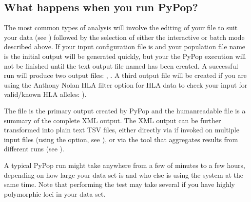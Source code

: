 \documentclass[letterpaper,10pt,english,openany,oneside]{sphinxmanual}
\begin{document}
\subsection{What happens when you run PyPop?}
\label{\detokenize{docs/guide-chapter-usage:what-happens-when-you-run-pypop}}\label{\detokenize{docs/guide-chapter-usage:guide-usage-intro-run-details}}
\sphinxAtStartPar
The most common types of analysis will involve the editing of your
 file to suit your data (see ) followed by the selection of either
the interactive or batch mode described above. If your input
configuration file is  and your population file name
is  the initial output will be generated quickly, but
your the PyPop execution will not be finished until the text output file
named  has been created. A successful run will
produce two output files: ,
. A third output file will be created if you are
using the Anthony Nolan HLA filter option for HLA data to check your
input for valid/known HLA alleles: ).

\sphinxAtStartPar
The  file is the primary output created by
PyPop and the human\sphinxhyphen{}readable  file is a
summary of the complete XML output. The XML output can be further
transformed into plain text TSV files, either directly via 
if invoked on multiple input files (using the  option,
see {\hyperref[\detokenize{docs/guide-chapter-usage:guide-pypop-cli}]{}}), or via the  tool that
aggregates results from different  runs (see
{\hyperref[\detokenize{docs/guide-chapter-usage:guide-usage-popmeta}]{}}).

\sphinxAtStartPar
A typical PyPop run might take anywhere from a few of minutes to a few
hours, depending on how large your data set is and who else is using the
system at the same time. Note that performing the
 test may take several  if you have
highly polymorphic loci in your data set.
\end{document}
